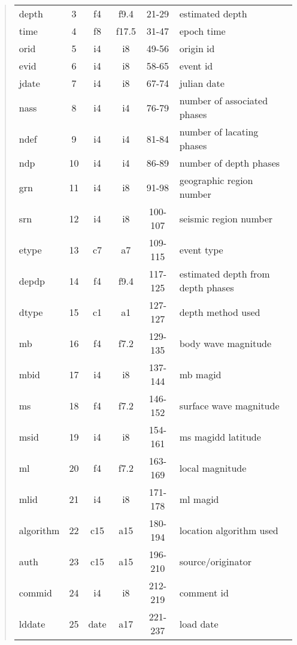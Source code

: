 \begin{quote}
\begin{center}
\begin{tabular*}{1.0\textwidth}{@{\extracolsep{\fill}}|lccccl|}
depth     &  3 & f4  &  f9.4 & 21-29   & estimated depth \\
time      &  4 & f8  &  f17.5& 31-47   & epoch time \\
orid      &  5 & i4  &  i8   & 49-56   & origin id \\
evid      &  6 & i4  &  i8   & 58-65   & event id \\
jdate     &  7 & i4  &  i8   & 67-74   & julian date \\
nass      &  8 & i4  &  i4   & 76-79   & number of associated phases \\
ndef      &  9 & i4  &  i4   & 81-84   & number of lacating phases \\
ndp       & 10 & i4  &  i4   & 86-89   & number of depth phases \\
grn       & 11 & i4  &  i8   & 91-98   & geographic region number \\
srn       & 12 & i4  &  i8   & 100-107 & seismic region number \\
etype     & 13 & c7  &  a7   & 109-115 & event type \\
depdp     & 14 & f4  &  f9.4 & 117-125 & estimated depth from depth phases \\
dtype     & 15 & c1  &  a1   & 127-127 & depth method used \\
mb        & 16 & f4  &  f7.2 & 129-135 & body wave magnitude \\
mbid      & 17 & i4  &  i8   & 137-144 & mb magid \\
ms        & 18 & f4  &  f7.2 & 146-152 & surface wave magnitude \\
msid      & 19 & i4  &  i8   & 154-161 & ms magidd latitude \\
ml        & 20 & f4  &  f7.2 & 163-169 & local magnitude \\
mlid      & 21 & i4  &  i8   & 171-178 & ml magid \\
algorithm & 22 & c15 &  a15  & 180-194 & location algorithm used \\
auth      & 23 & c15 &  a15  & 196-210 & source/originator \\
commid    & 24 & i4  &  i8   & 212-219 & comment id \\
lddate    & 25 & date &  a17 & 221-237 &  load date \\ \cline{1-6}
\end{tabular*}
\end{center}
\vspace{20pt}
\end{quote}
